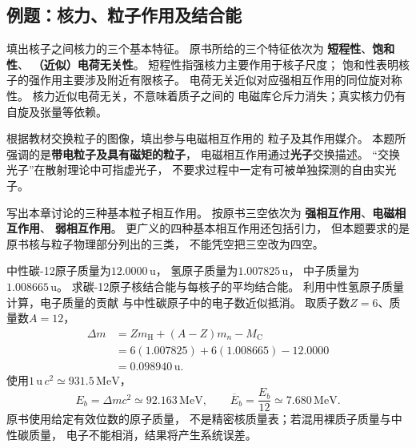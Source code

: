 \subsection{例题：核力、粒子作用及结合能}

\problemtext 填出核子之间核力的三个基本特征。
\workings
原书所给的三个特征依次为
\textbf{短程性}、\textbf{饱和性}、
\textbf{（近似）电荷无关性}。
短程性指强核力主要作用于核子尺度；
饱和性表明核子的强作用主要涉及附近有限核子。
电荷无关近似对应强相互作用的同位旋对称性。
\crosscheck 核力近似电荷无关，不意味着质子之间的
电磁库仑斥力消失；真实核力仍有自旋及张量等依赖。

\problemtext 根据教材交换粒子的图像，填出参与电磁相互作用的
粒子及其作用媒介。
\workings
本题所强调的是\textbf{带电粒子及具有磁矩的粒子}，
电磁相互作用通过\textbf{光子}交换描述。
\crosscheck “交换光子”在散射理论中可指虚光子，
不要求过程中一定有可被单独探测的自由实光子。

\problemtext 写出本章讨论的三种基本粒子相互作用。
\workings
按原书三空依次为
\textbf{强相互作用}、\textbf{电磁相互作用}、
\textbf{弱相互作用}。
\crosscheck 更广义的四种基本相互作用还包括引力，
但本题要求的是原书核与粒子物理部分列出的三类，
不能凭空把三空改为四空。

\problemtext 中性碳-12原子质量为$12.0000\,\mathrm u$，
氢原子质量为$1.007825\,\mathrm u$，
中子质量为$1.008665\,\mathrm u$。
求碳-12原子核结合能与每核子的平均结合能。
\workings
利用中性氢原子质量计算，电子质量的贡献
与中性碳原子中的电子数近似抵消。
取质子数$Z=6$、质量数$A=12$，
\[
 \begin{aligned}
 \Delta m&=Zm_{\mathrm H}+(A-Z)m_n-M_{\mathrm C}\\
 &=6(1.007825)+6(1.008665)-12.0000\\
 &=0.098940\,\mathrm u.
 \end{aligned}
\]
使用$1\,\mathrm u\,c^2\simeq931.5\,\mathrm{MeV}$，
\[
 \boxed{E_b=\Delta mc^2\simeq92.163\,\mathrm{MeV}},
 \qquad
 \boxed{\overline E_b=\frac{E_b}{12}\simeq7.680\,\mathrm{MeV}}.
\]
\crosscheck 原书使用给定有效位数的原子质量，
不是精密核质量表；若混用裸质子质量与中性碳质量，
电子不能相消，结果将产生系统误差。
